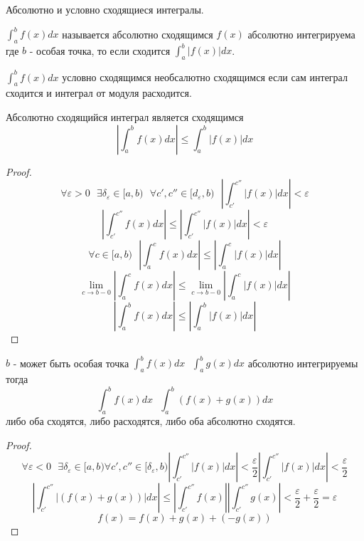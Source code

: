 \begin{title}[\Large]
  Абсолютно и условно сходящиеся интегралы.
\end{title}

\begin{defin}
  $\int_a^b f(x)dx$ называется абсолютно сходящимся $f(x)$ абсолютно
интегрируема где $b$ - особая точка, то если сходится $\int_a^b |f(x)|dx$.
\end{defin}

\begin{defin}
  $\int_a^b f(x)dx$ условно сходящимся необсалютно сходящимся если сам интеграл
сходится и интеграл от модуля расходится.
\end{defin}

\begin{theorem}
  Абсолютно сходящийся интеграл является сходящимся
  $$
  \left| \int_a^b f(x)dx \right| \le \int_a^b |f(x)|dx
  $$
\end{theorem}

\begin{proof}
  $$
  \forall \varepsilon > 0 ~~~ \exists \delta_{\varepsilon} \in [a,b) ~~~
  \forall c',c'' \in [d_{\varepsilon}, b) ~~~
  \left| \int_{c'}^{c''} |f(x)|dx \right| < \varepsilon
  $$
  $$
  \left| \int_{c'}^{c''} f(x)dx \right| \le
  \left| \int_{c'}^{c''} |f(x)|dx \right| < \varepsilon
  $$
  $$
  \forall c \in [a,b) ~~~ \left| \int_a^c f(x)dx \right| \le
  \left| \int_a^c |f(x)|dx \right|
  $$
  $$
  \lim_{c \to b-0} \left| \int_a^{c} f(x)dx \right| \le
  \lim_{c \to b-0} \left| \int_a^c |f(x)|dx \right|
  $$
  $$
  \left| \int_a^b f(x)dx \right| \le
  \left| \int_a^b |f(x)|dx \right|
  $$
\end{proof}

\begin{theorem}
  $b$ - может быть особая точка $\int_a^b f(x)dx ~~~ \int_a^b g(x)dx$
абсолютно интегрируемы тогда
  $$
  \int_a^b f(x)dx ~~~ \int_a^b (f(x) + g(x)) dx
  $$
  либо оба сходятся, либо расходятся, либо оба абсолютно сходятся.
\end{theorem}

\begin{proof}
  $$
  \forall \varepsilon < 0 ~~~ \exists \delta_{\varepsilon} \in [a,b)
  \forall c', c'' \in [\delta_{\varepsilon}, b)
  \left| \int_{c'}^{c''} |f(x)|dx \right| < \frac{\varepsilon}{2}
  \left| \int_{c'}^{c''} |f(x)|dx \right| < \frac{\varepsilon}{2}
  $$
  $$
  \left| \int_{c'}^{c''} |(f(x) + g(x))| dx \right| \le
  \left| \int_{c'}^{c''} f(x) \right| \left| \int_{c'}^{c''} g(x) \right|
  < \frac{\varepsilon}{2} + \frac{\varepsilon}{2} = \varepsilon
  $$
  $$
  f(x) = f(x) + g(x) + (-g(x))
  $$
\end{proof}


